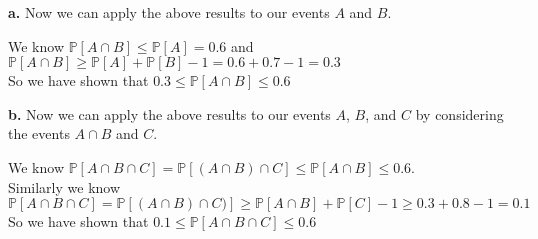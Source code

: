 \documentclass{article}
\begin{document}
{\Large\textbf{a.}} Now we can apply the above results to our events $A$ and $B$.
\begin{center}
\doublespacing
    We know $\mathbb{P}[A\cap B]\leq\mathbb{P}[A] = 0.6$ and $\mathbb{P}[A\cap B]\geq\mathbb{P}[A] +\mathbb{P}[B] - 1 = 0.6 + 0.7 - 1 = 0.3$
    \\So we have shown that $0.3\leq\mathbb{P}[A\cap B]\leq 0.6$ \qedsymbol
\end{center}
{\Large\textbf{b.}} Now we can apply the above results to our events $A$, $B$, and $C$ by considering the events $A\cap B$ and $C$.
\begin{center}
\doublespacing
    We know $\mathbb{P}[A\cap B\cap C] =\mathbb{P}[(A\cap B)\cap C]\leq\mathbb{P}[A\cap B]\leq 0.6$.
    \\Similarly we know $\mathbb{P}[A\cap B\cap C] =\mathbb{P}[(A\cap B)\cap C)]\geq\mathbb{P}[A\cap B] +\mathbb{P}[C] - 1\geq 0.3 + 0.8 - 1 = 0.1$
    \\So we have shown that $0.1\leq\mathbb{P}[A\cap B\cap C]\leq 0.6$ \qedsymbol
\end{center}


\newpage
\end{document}
